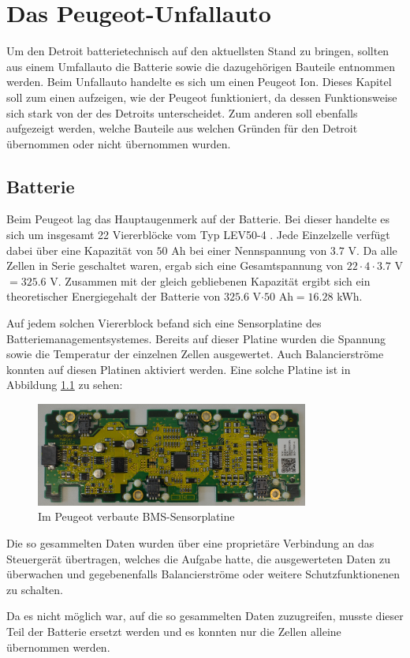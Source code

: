 \chapter{Das Peugeot-Unfallauto}
Um den Detroit batterietechnisch auf den aktuellsten Stand zu bringen, sollten aus einem Umfallauto die Batterie sowie die dazugehörigen Bauteile entnommen werden. Beim Unfallauto handelte es sich um einen Peugeot Ion. Dieses Kapitel soll zum einen aufzeigen, wie der Peugeot funktioniert, da dessen Funktionsweise sich stark von der des Detroits unterscheidet. Zum anderen soll ebenfalls aufgezeigt werden, welche Bauteile aus welchen Gründen für den Detroit übernommen oder nicht übernommen wurden.

\section{Batterie}
Beim Peugeot lag das Hauptaugenmerk auf der Batterie. Bei dieser handelte es sich um insgesamt 22 Viererblöcke vom Typ LEV50-4 \cite{lev50}. Jede Einzelzelle verfügt dabei über eine Kapazität von $50$ Ah bei einer Nennspannung von $3.7$ V. Da alle Zellen in Serie geschaltet waren, ergab sich eine Gesamtspannung von $22\cdot 4\cdot 3.7$ V$=325.6$ V. Zusammen mit der gleich gebliebenen Kapazität ergibt sich ein theoretischer Energiegehalt der Batterie von $325.6$ V$\cdot50$ Ah$=16.28$ kWh.

Auf jedem solchen Viererblock befand sich eine Sensorplatine des Batteriemanagementsystemes. Bereits auf dieser Platine wurden die Spannung sowie die Temperatur der einzelnen Zellen ausgewertet. Auch Balancierströme konnten auf diesen Platinen aktiviert werden. Eine solche Platine ist in Abbildung \ref{fig:BMS_Alt} zu sehen:

\begin{figure}[h!]
	\centering
		\includegraphics[width=0.80\textwidth]{images/BMS_Alt.JPG}
	\caption{Im Peugeot verbaute BMS-Sensorplatine}
	\label{fig:BMS_Alt}
\end{figure}

Die so gesammelten Daten wurden über eine proprietäre Verbindung an das Steuergerät übertragen, welches die Aufgabe hatte, die ausgewerteten Daten zu überwachen und gegebenenfalls Balancierströme oder weitere Schutzfunktionenen zu schalten.

Da es nicht möglich war, auf die so gesammelten Daten zuzugreifen, musste dieser Teil der Batterie ersetzt werden und es konnten nur die Zellen alleine übernommen werden.


\newpage